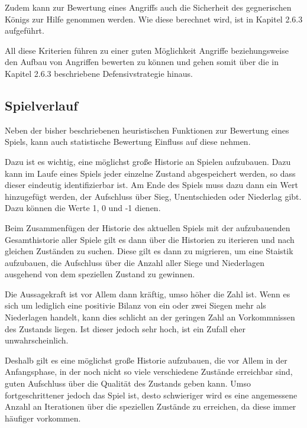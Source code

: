 
Zudem kann zur Bewertung eines Angriffs auch die Sicherheit des gegnerischen Königs zur Hilfe genommen werden. Wie diese berechnet wird, ist in Kapitel 2.6.3 aufgeführt.

All diese Kriterien führen zu einer guten Möglichkeit Angriffe beziehungsweise den Aufbau von Angriffen bewerten zu können und gehen somit über die in Kapitel 2.6.3 beschriebene Defensivstrategie hinaus.


\subsection{Spielverlauf}

Neben der bisher beschriebenen heuristischen Funktionen zur Bewertung eines Spiels, kann auch statistische Bewertung Einfluss auf diese nehmen.

Dazu ist es wichtig, eine möglichst große Historie an Spielen aufzubauen. Dazu kann im Laufe eines Spiels jeder einzelne Zustand abgespeichert werden, so dass dieser eindeutig identifizierbar ist. Am Ende des Spiels muss dazu dann ein Wert hinzugefügt werden, der Aufschluss über Sieg, Unentschieden oder Niederlag gibt. Dazu können die Werte 1, 0 und -1 dienen.

Beim Zusammenfügen der Historie des aktuellen Spiels mit der aufzubauenden Gesamthistorie aller Spiele gilt es dann über die Historien zu iterieren und nach gleichen Zuständen zu suchen. Diese gilt es dann zu migrieren, um eine Staistik aufzubauen, die Aufschluss über die Anzahl aller Siege und Niederlagen ausgehend von dem speziellen Zustand zu gewinnen.

Die Aussagekraft ist vor Allem dann kräftig, umso höher die Zahl ist. Wenn es sich um lediglich eine positivie Bilanz von ein oder zwei Siegen mehr als Niederlagen handelt, kann dies schlicht an der geringen Zahl an Vorkommnissen des Zustands liegen. Ist dieser jedoch sehr hoch, ist ein Zufall eher unwahrscheinlich.

Deshalb gilt es eine möglichst große Historie aufzubauen, die vor Allem in der Anfangsphase, in der noch nicht so viele verschiedene Zustände erreichbar sind, guten Aufschluss über die Qualität des Zustands geben kann. Umso fortgeschrittener jedoch das Spiel ist, desto schwieriger wird es eine angemessene Anzahl an Iterationen über die speziellen Zustände zu erreichen, da diese immer häufiger vorkommen.

